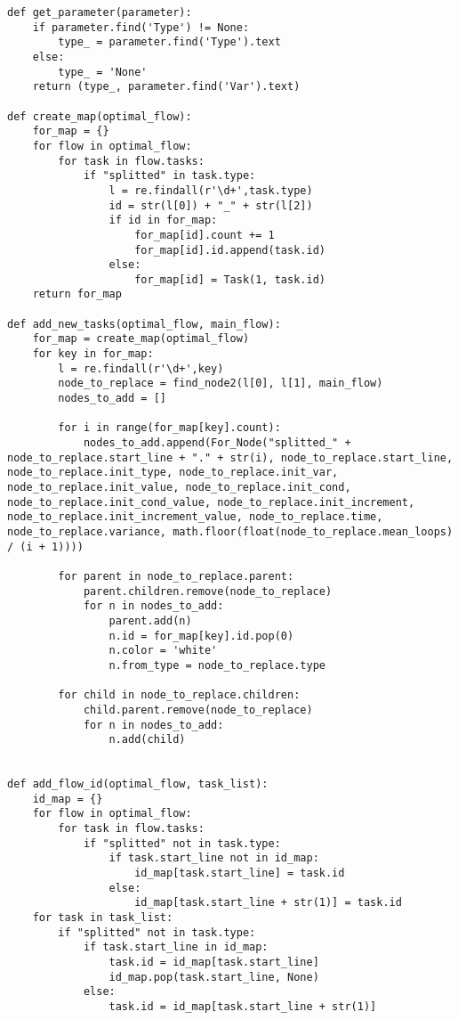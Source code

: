 \documentclass[a4paper,10pt,twoside]{book}
\begin{document}
\begin{lstlisting}[language=CCC, caption=pargraph.py]
def get_parameter(parameter):
	if parameter.find('Type') != None:
		type_ = parameter.find('Type').text
	else:
		type_ = 'None'
	return (type_, parameter.find('Var').text)

def create_map(optimal_flow):
	for_map = {}
	for flow in optimal_flow:
		for task in flow.tasks:
			if "splitted" in task.type:
				l = re.findall(r'\d+',task.type)
				id = str(l[0]) + "_" + str(l[2])
				if id in for_map:
					for_map[id].count += 1
					for_map[id].id.append(task.id)
				else:
					for_map[id] = Task(1, task.id)
	return for_map

def add_new_tasks(optimal_flow, main_flow):
	for_map = create_map(optimal_flow)
	for key in for_map:
		l = re.findall(r'\d+',key)
		node_to_replace = find_node2(l[0], l[1], main_flow)
		nodes_to_add = []

		for i in range(for_map[key].count):
			nodes_to_add.append(For_Node("splitted_" + node_to_replace.start_line + "." + str(i), node_to_replace.start_line, node_to_replace.init_type, node_to_replace.init_var, node_to_replace.init_value, node_to_replace.init_cond, node_to_replace.init_cond_value, node_to_replace.init_increment, node_to_replace.init_increment_value, node_to_replace.time, node_to_replace.variance, math.floor(float(node_to_replace.mean_loops) / (i + 1))))

		for parent in node_to_replace.parent:
			parent.children.remove(node_to_replace)
			for n in nodes_to_add:
				parent.add(n)
				n.id = for_map[key].id.pop(0)
				n.color = 'white'
				n.from_type = node_to_replace.type

		for child in node_to_replace.children:
			child.parent.remove(node_to_replace)
			for n in nodes_to_add:
				n.add(child) 


def add_flow_id(optimal_flow, task_list):
	id_map = {}
	for flow in optimal_flow:
		for task in flow.tasks:
			if "splitted" not in task.type:
				if task.start_line not in id_map:
					id_map[task.start_line] = task.id
				else:
					id_map[task.start_line + str(1)] = task.id
	for task in task_list:
		if "splitted" not in task.type:
			if task.start_line in id_map:
				task.id = id_map[task.start_line]
				id_map.pop(task.start_line, None)
			else:
				task.id = id_map[task.start_line + str(1)]

\end{lstlisting}
\end{document}
